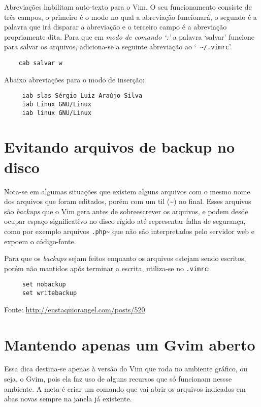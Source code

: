 Abreviações habilitam auto-texto para o Vim. O seu funcionamento consiste de
três campos, o primeiro é o modo no qual a abreviação funcionará, o segundo é a
palavra que irá disparar a abreviação e o terceiro campo é a abreviação
propriamente dita. Para que em {\em modo de comando `:'} a palavra `salvar'
funcione para salvar os arquivos, adiciona-se a seguinte abreviação ao `{\tt
\textasciitilde/.vimrc}'. 

\begin{verbatim}
    cab salvar w
\end{verbatim}

Abaixo abreviações para o modo de inserção:

\begin{verbatim}
     iab slas Sérgio Luiz Araújo Silva
     iab Linux GNU/Linux
     iab linux GNU/Linux
\end{verbatim}

\section{Evitando arquivos de backup no disco}
\label{Evitando arquivos de backup no disco}

Nota-se em algumas situações que existem alguns arquivos com o mesmo nome dos
arquivos que foram editados, porém com um til (\textasciitilde) no final. Esses
arquivos são {\em backups} que o Vim gera antes de sobreescrever os arquivos, e
podem desde ocupar espaço significativo no disco rígido até representar falha
de segurança, como por exemplo arquivos {\tt .php\textasciitilde} que não são
interpretados pelo servidor web e expoem o código-fonte.

Para que os {\em backups} sejam feitos enquanto os arquivos estejam sendo escritos, porém não 
mantidos após terminar a escrita, utiliza-se no \verb|.vimrc|:

\begin{verbatim}
     set nobackup
     set writebackup
\end{verbatim}

Fonte: \url{http://eustaquiorangel.com/posts/520}

\section{Mantendo apenas um Gvim aberto}
\label{Mantenddo apenas um Gvim aberto}

Essa dica destina-se apenas à versâo do Vim que roda no ambiente gráfico, ou
seja, o Gvim, pois ela faz uso de alguns recursos que só funcionam nessse
ambiente. A meta é criar um comando que vai abrir os arquivos indicados em abas
novas sempre na janela já existente. 

